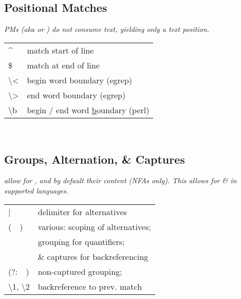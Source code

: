 \\
\\
\\


\subsection*{Positional Matches}
\textit{PMs (aka  or ) do not consume text, yielding only a text position.}\\
\begin{tabular}{l  l}
    \textasciicircum & match start of line \\
    \$ & match at end of line \\
    \textbackslash < & begin word boundary (egrep) \\
    \textbackslash > & end word boundary (egrep) \\
    \textbackslash b & begin / end word \ul{b}oundary (perl) \\
\end{tabular}
\\


\subsection*{Groups, Alternation, \& Captures}
\textit{ allow for , and by default  their content (NFAs only). This allows for \&  in supported languages.}\\
\begin{tabular}{l  l}
    |           & delimiter for alternatives \\
    ( \,\, )    & various: scoping of alternatives; \\
                & grouping for quantifiers; \\
                & \& captures for backreferencing \\
    (?: \,\, )    & non-captured grouping; \\
        \textbackslash 1, \textbackslash 2  & backreference to prev. match
\end{tabular}

